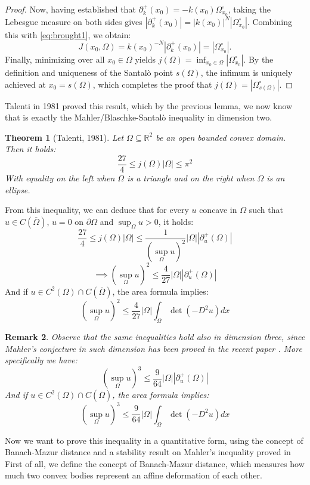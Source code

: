 \documentclass{article}
\newtheorem{theorem}{Theorem}[section]
\newtheorem{remark}[theorem]{Remark}
\numberwithin{equation}{section}
\begin{document}
\begin{proof}
\noindent Now, having established that $\partial^+_k(x_0) = -k(x_0)\Omega^\circ_{x_0}$, taking the Lebesgue measure on both sides gives $|\partial^+_k(x_0)| = |k(x_0)|^N |\Omega^\circ_{x_0}|$. Combining this with \eqref{eq:brought1}, we obtain:
\[
J(x_0, \Omega) = k(x_0)^{-N} |\partial^+_k(x_0)| = |\Omega^\circ_{x_0}|.
\]
Finally, minimizing over all $x_0 \in \Omega$ yields $j(\Omega) = \inf_{x_0 \in \Omega} |\Omega^\circ_{x_0}|$. By the definition and uniqueness of the Santalò point $s(\Omega)$, the infimum is uniquely achieved at $x_0 = s(\Omega)$, which completes the proof that $j(\Omega) = |\Omega^\circ_{s(\Omega)}|$.
\end{proof}
\noindent Talenti in 1981 proved this result, which by the previous lemma, we now know that is exactly the Mahler/Blaschke-Santalò inequality in dimension two.
\begin{theorem}[Talenti, 1981]
    Let $\Omega \subseteq \mathbb{R}^2$ be an open bounded convex domain. Then it holds:
    $$\frac{27}{4}\leq j(\Omega)|\Omega|\leq \pi^2 $$
    With equality on the left when $\Omega$ is a triangle and on the right when $\Omega$ is an ellipse.
\end{theorem}
\noindent From this inequality, we can deduce that for every $u$ concave in $\Omega$ such that $u \in C({\overline{\Omega}})$, $u = 0$ on  $\partial \Omega$ and $\sup_\Omega u >0$, it holds:
$$\frac{27}{4} \leq j(\Omega) |\Omega| \leq \frac{1}{(\sup_\Omega u)^2}|\Omega||\partial^+_u(\Omega)| $$
    $$\implies (\sup_\Omega u)^2 \leq \frac{4}{27}|\Omega||\partial^+_u(\Omega)|$$
    \noindent And if $u \in C^{2}(\Omega)\cap C(\overline{\Omega})$, the area formula implies:
    $$(\sup_\Omega u)^2 \leq\frac{4}{27}|\Omega|\int_\Omega \det (-D^2u) dx$$
\begin{remark}
    Observe that the same inequalities hold also in dimension three, since Mahler's conjecture in such dimension has been proved in the recent paper \cite{chen2026mahler}. More specifically we have:
    $$(\sup_\Omega u)^3 \leq \frac{9}{64}|\Omega||\partial^+_u(\Omega)|$$
    \noindent And if $u \in C^{2}(\Omega) \cap C(\overline{\Omega})$, the area formula implies:
    \begin{equation}\label{eq:Talenti3}
    (\sup_\Omega u)^3 \leq\frac{9}{64}|\Omega|\int_\Omega \det (-D^2u) dx
    \end{equation}
\end{remark}
\noindent Now we want to prove this inequality in a quantitative form, using the concept of Banach-Mazur distance and a stability result on Mahler's inequality proved in \cite{boroczky2013}
First of all, we define the concept of Banach-Mazur distance, which measures how much two convex bodies represent an affine deformation of each other.
\end{document}
